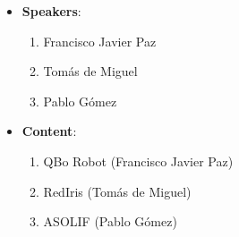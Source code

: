 \documentclass[a4paper]{article}
\begin{document}
\begin{itemize}
 \item \textbf{Speakers}:

  \begin{enumerate}
   \item Francisco Javier Paz
   \item Tomás de Miguel
   \item Pablo Gómez
  \end{enumerate}

 \item \textbf{Content}:

  \begin{enumerate}
   \item QBo Robot (Francisco Javier Paz)
   \item RedIris (Tomás de Miguel)
   \item ASOLIF (Pablo Gómez)
  \end{enumerate}

\end{itemize}
\end{document}
